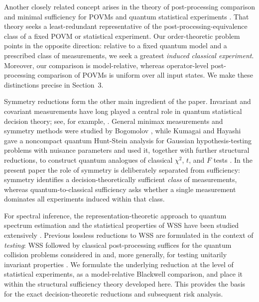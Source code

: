 \documentclass{article}
\theoremstyle{named}
\theoremstyle{named1}
\theoremstyle{plain}
\theoremstyle{remark}
\begin{document}
Another closely related concept arises in the theory of
post-processing comparison and minimal sufficiency for POVMs and quantum
statistical experiments \cite{Kuramochi2015,Kuramochi2017}. That theory
seeks a least-redundant representative of the post-processing-equivalence
class of a fixed POVM or statistical experiment. Our order-theoretic problem
points in the opposite direction: relative to a fixed quantum model and a
prescribed class of measurements, we seek a greatest \emph{induced
classical experiment}. Moreover, our comparison is model-relative, whereas
operator-level post-processing comparison of POVMs is uniform over all input
states. We make these distinctions precise in Section~3.

Symmetry reductions form the other main ingredient of the paper. Invariant
and covariant measurements have long played a central role in quantum
statistical decision theory; see, for example, \cite{Holevo2011}. General
minimax measurements and symmetry methods were studied by Bogomolov
\cite{bogomolov1982minimax}, while Kumagai and Hayashi gave a noncompact
quantum Hunt-Stein analysis for Gaussian hypothesis-testing problems with
nuisance parameters and used it, together with further structural
reductions, to construct quantum analogues of classical $\chi^2$, $t$, and
$F$ tests \cite{KumagaiHayashi2013}. In the present paper the role of
symmetry is deliberately separated from sufficiency: symmetry identifies a
decision-theoretically sufficient \emph{class} of measurements, whereas
quantum-to-classical sufficiency asks whether a single measurement dominates
all experiments induced within that class.

For spectral inference, the representation-theoretic approach to
quantum spectrum estimation and the statistical properties of WSS
have been studied extensively
\cite{alicki,keyl_werner,harrow,odonnell2016efficient,odonellspectrum}.
Previous lossless reductions to WSS are formulated in the context of
\emph{testing}: WSS followed by classical post-processing suffices for
the quantum collision problems considered in \cite{harrow} and, more
generally, for testing unitarily invariant properties
\cite{MontanaroDeWolf2016,odonellspectrum}. We formulate the
underlying reduction at the level of statistical experiments, as a
model-relative Blackwell comparison, and place it within the structural
sufficiency theory developed here. This provides the basis for the exact
decision-theoretic reductions and subsequent risk analysis.
\end{document}
